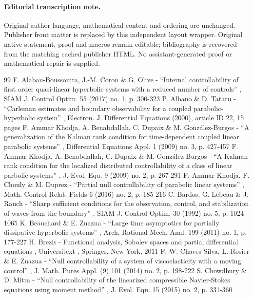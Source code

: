 \documentclass[11pt]{article}
\begin{document}
\paragraph{Editorial transcription note.}
Original author language, mathematical content and ordering are unchanged. Publisher front matter is replaced by this independent layout wrapper. Original native statement, proof and macros remain editable; bibliography is recovered from the matching cached publisher HTML. No assistant-generated proof or mathematical repair is supplied.
\clearpage

\begin{thebibliography}{99}
 F. Alabau-Boussouira, J.-M. Coron \& G. Olive - “Internal controllability of first order quasi-linear hyperbolic systems with a reduced number of controls” , SIAM J. Control Optim. 55 (2017) no. 1, p. 300-323
 P. Albano \& D. Tataru - “Carleman estimates and boundary observability for a coupled parabolic-hyperbolic system” , Electron. J. Differential Equations (2000), article ID 22, 15 pages
 F. Ammar Khodja, A. Benabdallah, C. Dupaix \& M. González-Burgos - “A generalization of the Kalman rank condition for time-dependent coupled linear parabolic systems” , Differential Equations Appl. 1 (2009) no. 3, p. 427-457
 F. Ammar Khodja, A. Benabdallah, C. Dupaix \& M. González-Burgos - “A Kalman rank condition for the localized distributed controllability of a class of linear parbolic systems” , J. Evol. Equ. 9 (2009) no. 2, p. 267-291
 F. Ammar Khodja, F. Chouly \& M. Duprez - “Partial null controllability of parabolic linear systems” , Math. Control Relat. Fields 6 (2016) no. 2, p. 185-216
 C. Bardos, G. Lebeau \& J. Rauch - “Sharp sufficient conditions for the observation, control, and stabilization of waves from the boundary” , SIAM J. Control Optim. 30 (1992) no. 5, p. 1024-1065
 K. Beauchard \& E. Zuazua - “Large time asymptotics for partially dissipative hyperbolic systems” , Arch. Rational Mech. Anal. 199 (2011) no. 1, p. 177-227
 H. Brezis - Functional analysis, Sobolev spaces and partial differential equations , Universitext , Springer, New York, 2011
 F. W. Chaves-Silva, L. Rosier \& E. Zuazua - “Null controllability of a system of viscoelasticity with a moving control” , J. Math. Pures Appl. (9) 101 (2014) no. 2, p. 198-222
 S. Chowdhury \& D. Mitra - “Null controllability of the linearized compressible Navier-Stokes equations using moment method” , J. Evol. Equ. 15 (2015) no. 2, p. 331-360

\end{thebibliography}
\end{document}
